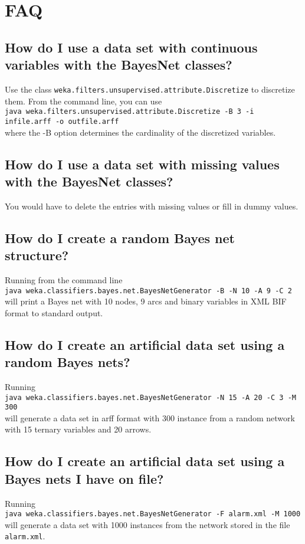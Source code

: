 \documentclass[a4paper]{article}
\begin{document}
\section{FAQ}

\subsection*{How do I use a data set with continuous variables with the BayesNet classes?}
Use the class {\tt weka.filters.unsupervised.attribute.Discretize} to discretize them.
From the command line, you can use\\
{\tt java weka.filters.unsupervised.attribute.Discretize -B 3 -i infile.arff -o outfile.arff}\\
where the -B option determines the cardinality of the discretized variables.

\subsection*{How do I use a data set with missing values with the BayesNet classes?}
You would have to delete the entries with missing values or
fill in dummy values.

\subsection*{How do I create a random Bayes net structure?}

Running from the command line \\
{\tt java  weka.classifiers.bayes.net.BayesNetGenerator -B -N 10 -A 9 -C 2}\\
will print a Bayes net with 10 nodes, 9 arcs and binary variables
in XML BIF format to standard output.

\subsection*{How do I create an artificial data set using a random Bayes nets?}
Running\\
{\tt java  weka.classifiers.bayes.net.BayesNetGenerator -N 15 -A 20 -C 3 -M 300}\\
will generate a data set in arff format with 300 instance from a random
network with 15 ternary variables and 20 arrows.

\subsection*{How do I create an artificial data set using a Bayes nets I have on file?}
Running\\
{\tt java  weka.classifiers.bayes.net.BayesNetGenerator -F alarm.xml -M 1000}\\
will generate a data set with 1000 instances from the network stored in the file
{\tt alarm.xml}.
\end{document}
